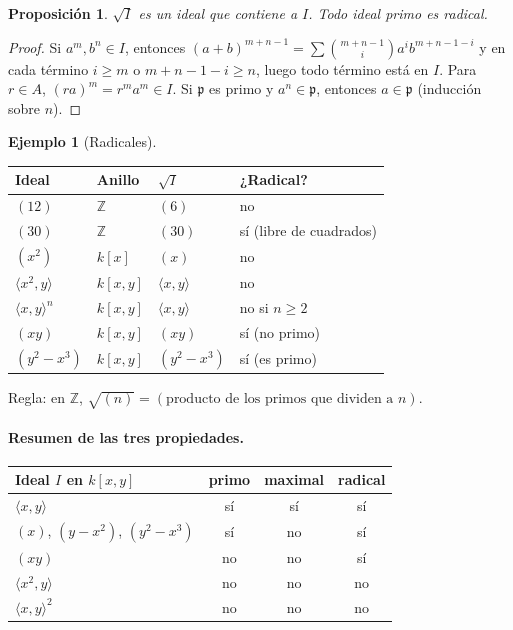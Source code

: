 \documentclass[11pt,a4paper]{article}
\newcommand{\ZZ}{\mathbb{Z}}
\newcommand{\pp}{\mathfrak{p}}
\newcommand{\gen}[1]{\langle #1\rangle}
\theoremstyle{plain}
\newtheorem{proposicion}[teorema]{Proposición}
\theoremstyle{definition}
\newtheorem{ejemplo}[teorema]{Ejemplo}
\theoremstyle{remark}
\newcounter{ej}
\begin{document}
\begin{proposicion}
$\sqrt I$ es un ideal que contiene a $I$. Todo ideal primo es radical.
\end{proposicion}
\begin{proof}
Si $a^m,b^n\in I$, entonces $(a+b)^{m+n-1}=\sum\binom{m+n-1}{i}a^ib^{m+n-1-i}$ y en cada término $i\ge m$ o $m+n-1-i\ge n$, luego todo término está en $I$. Para $r\in A$, $(ra)^m=r^ma^m\in I$. Si $\pp$ es primo y $a^n\in\pp$, entonces $a\in\pp$ (inducción sobre $n$).
\end{proof}

\begin{ejemplo}[Radicales]\label{ej:radicales}
\begin{center}
\begin{tabular}{@{}llll@{}}
\toprule
Ideal & Anillo & $\sqrt I$ & ¿Radical? \\
\midrule
$(12)$ & $\ZZ$ & $(6)$ & no \\
$(30)$ & $\ZZ$ & $(30)$ & sí (libre de cuadrados) \\
$(x^2)$ & $k[x]$ & $(x)$ & no \\
$\gen{x^2,y}$ & $k[x,y]$ & $\gen{x,y}$ & no \\
$\gen{x,y}^n$ & $k[x,y]$ & $\gen{x,y}$ & no si $n\ge2$ \\
$(xy)$ & $k[x,y]$ & $(xy)$ & sí (no primo) \\
$(y^2-x^3)$ & $k[x,y]$ & $(y^2-x^3)$ & sí (es primo) \\
\bottomrule
\end{tabular}
\end{center}
Regla: en $\ZZ$, $\sqrt{(n)}=(\text{producto de los primos que dividen a }n)$.
\end{ejemplo}

\paragraph{Resumen de las tres propiedades.}
\begin{center}
\begin{tabular}{@{}lccc@{}}
\toprule
Ideal $I$ en $k[x,y]$ & primo & maximal & radical \\
\midrule
$\gen{x,y}$ & sí & sí & sí \\
$(x)$, $(y-x^2)$, $(y^2-x^3)$ & sí & no & sí \\
$(xy)$ & no & no & sí \\
$\gen{x^2,y}$ & no & no & no \\
$\gen{x,y}^2$ & no & no & no \\
\bottomrule
\end{tabular}
\end{center}
\end{document}
